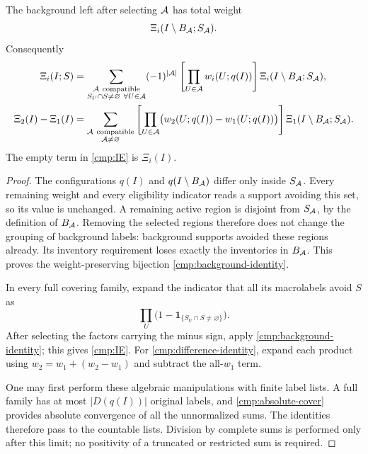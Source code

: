 \begin{lemma}
\label{cmp:removal-identities}
The background left after selecting \({\cal A}\) has total weight
\begin{equation}
 \Xi_i(I\setminus B_{\cal A};S_{\cal A}).
 \label{cmp:background-identity}
\end{equation}
Consequently
\begin{align}
 \Xi_i(I;S)
 &=
 \sum_{\substack{{\cal A}\ {\rm compatible}\\
                   S_U\cap S\ne\varnothing\ \forall U\in{\cal A}}}
 (-1)^{|{\cal A}|}
 \left[\prod_{U\in{\cal A}}w_i(U;q(I))\right]
 \Xi_i(I\setminus B_{\cal A};S_{\cal A}),                 \label{cmp:IE}\\
 \Xi_2(I)-\Xi_1(I)
 &=
 \sum_{\substack{{\cal A}\ {\rm compatible}\\{\cal A}\ne\varnothing}}
 \left[\prod_{U\in{\cal A}}
       \bigl(w_2(U;q(I))-w_1(U;q(I))\bigr)\right]
 \Xi_1(I\setminus B_{\cal A};S_{\cal A}).                 \label{cmp:difference-identity}
\end{align}
The empty term in \eqref{cmp:IE} is \(\Xi_i(I)\).
\end{lemma}

\begin{proof}
The configurations \(q(I)\) and \(q(I\setminus B_{\cal A})\) differ
only inside \(S_{\cal A}\).  Every remaining weight and every
eligibility indicator reads a support avoiding this set, so its value
is unchanged.  A remaining active region is disjoint from
\(S_{\cal A}\), by the definition of \(B_{\cal A}\).  Removing the
selected regions therefore does not change the grouping of background
labels: background supports avoided these regions already.  Its
inventory requirement loses exactly the inventories in
\(B_{\cal A}\).  This proves the weight-preserving bijection
\eqref{cmp:background-identity}.

In every full covering family, expand the indicator that all its
macrolabels avoid \(S\) as
\[
 \prod_U\bigl(1-\mathbf1_{\{S_U\cap S\ne\varnothing\}}\bigr).
\]
After selecting the factors carrying the minus sign, apply
\eqref{cmp:background-identity}; this gives \eqref{cmp:IE}.  For
\eqref{cmp:difference-identity}, expand each product using
\(w_2=w_1+(w_2-w_1)\) and subtract the all-\(w_1\) term.

One may first perform these algebraic manipulations with finite label
lists.  A full family has at most \(|D(q(I))|\) original labels, and
\eqref{cmp:absolute-cover} provides absolute convergence of all the
unnormalized sums.  The identities therefore pass to the countable
lists.  Division by complete sums is performed only after this limit;
no positivity of a truncated or restricted sum is required.
\end{proof}

